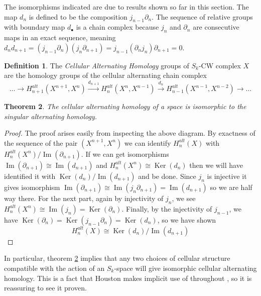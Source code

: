 \documentclass[11pt,a4paper,twoside]{article}
\theoremstyle{plain}
\newtheorem{thm}{Theorem}[subsection]
\theoremstyle{definition}
\newtheorem{defn}[thm]{Definition}
\theoremstyle{definition}
\theoremstyle{definition}
\theoremstyle{definition}
\theoremstyle{definition}
\newtheorem*{remark}{Remark}
\DeclareMathOperator{\Ima}{Im}
\DeclareMathOperator{\Ker}{Ker}
\begin{document}
The isomorphisms indicated are due to results shown so far in this section. The map $d_n$ is defined to be the composition $j_{n\!-\!1}\partial_n$. The sequence of relative groups with boundary map $d_\bullet$ is a chain complex because $j_n$ and $\partial_n$ are consecutive maps in an exact sequence, meaning $d_nd_{n\!+\!1}=(j_{n\!-\!1}\partial_n)(j_{n}\partial_{n+1})=j_{n\!-\!1}(\partial_nj_{n})\partial_{n+1}=0$.


\begin{defn}
\label{Defn:CellularAlternatingHomology}
The \emph{Cellular Alternating Homology} groups of $S_k$-CW complex $X$ are the homology groups of the cellular alternating chain complex
$$\dots\longrightarrow H^{alt}_{n\!+\!1}(X^{n\!+\!1},X^n) \overset{d_{n+1}}\longrightarrow H^{alt}_{n}(X^n,X^{n\!-\!1}) \overset{d_{n}}\longrightarrow H^{alt}_{n\!-\!1}(X^{n\!-\!1},X^{n\!-\!2})\longrightarrow\dots$$
\end{defn}

\begin{thm}
\label{Thm:EquivalenceCellularSingular}
The cellular alternating homology of a space is isomorphic to the singular alternating homology.
\end{thm}
\begin{proof}
The proof arises easily from inspecting the above diagram. By exactness of the sequence of the pair $(X^{n\!+\!1},X^n)$ we can identify $H^{alt}_n(X)$ with $H^{alt}_n(X^n)/\Ima(\partial_{n\!+\!1})$. If we can get isomorphisms $\Ima(\partial_{n\!+\!1})\cong\Ima (d_{n\!+\!1})$ and $H_n^{alt}(X^n)\cong \Ker (d_n)$ then we will have identified it with $\Ker( d_n)/\Ima( d_{n\!+\!1})$ and be done. Since $j_n$ is injective it gives isomorphism $\Ima(\partial_{n\!+\!1})\cong\Ima(j_n\partial_{n\!+\!1})=\Ima(d_{n\!+\!1})$ so we are half way there. For the next part, again by injectivity of $j_n$, we see $H_n^{alt}(X^n)\cong\Ima(j_n)=\Ker(\partial_n)$. Finally, by the injectivity of $j_{n\!-\!1}$, we have $\Ker(\partial_n)=\Ker (j_{n\!-\!1}\partial_n)=\Ker (d_n)$, so we have shown
$$H^{alt}_n(X)\cong \Ker( d_n)/\Ima( d_{n\!+\!1})$$
\end{proof}

In particular, theorem \ref{Thm:EquivalenceCellularSingular} implies that any two choices of cellular structure compatible with the action of an $S_k$-space will give isomorphic cellular alternating homology. This is a fact that Houston makes implicit use of throughout \cite{HoustonTopology}, so it is reassuring to see it proven.
\end{document}
